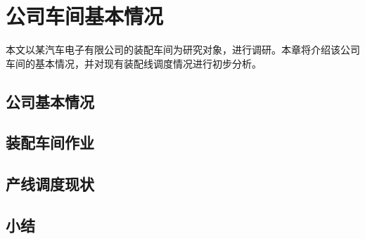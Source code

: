 \chapter{公司车间基本情况}
本文以某汽车电子有限公司的装配车间为研究对象，进行调研。本章将介绍该公司车间的基本情况，并对现有装配线调度情况进行初步分析。
\section{公司基本情况}

\section{装配车间作业}

\section{产线调度现状}

\section{小结}